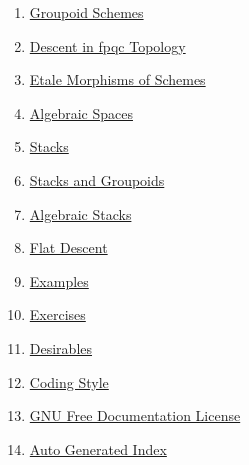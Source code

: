 \begin{multicols}{2}
\begin{enumerate}
\item \hyperref[groupoids-section-phantom]{Groupoid Schemes}
\item \hyperref[fpqc-descent-section-phantom]{Descent in fpqc Topology}
\item \hyperref[etale-section-phantom]{Etale Morphisms of Schemes}
\item \hyperref[spaces-section-phantom]{Algebraic Spaces}
\item \hyperref[stacks-section-phantom]{Stacks}
\item \hyperref[stacks-groupoids-section-phantom]{Stacks and Groupoids}
\item \hyperref[algebraic-section-phantom]{Algebraic Stacks}
\item \hyperref[flat-section-phantom]{Flat Descent}
\item \hyperref[examples-section-phantom]{Examples}
\item \hyperref[exercises-section-phantom]{Exercises}
\item \hyperref[desirables-section-phantom]{Desirables}
\item \hyperref[coding-section-phantom]{Coding Style}
\item \hyperref[fdl-section-phantom]{GNU Free Documentation License}
\item \hyperref[index-section-phantom]{Auto Generated Index}
\end{enumerate}
\end{multicols}
